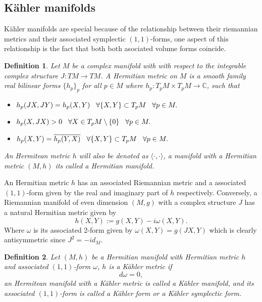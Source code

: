 \documentclass[12pt,twoside,a4paper]{report}
\newtheorem{definition}{Definition}[section]
\newcommand{\co}{\ensuremath{\mathbb C }}
\begin{document}
\subsection{Kähler manifolds}
Kähler manifolds are special because of the relationship between their riemannian metrics and their associated symplectic $(1,1)$-forms, one aspect of this relationship is the fact that both both asociated volume forms coincide.
\begin{definition}
        Let $M$ be a complex manifold with with respect to the integrable complex structure
        $J:TM\rightarrow TM$. A \textit{Hermitian metric} on $M$ is a smooth family
        real bilinear forms $\lbrace h_p\rbrace_p$ for all $p\in M$ where
        $h_p:T_pM\times T_pM\rightarrow\co$, such that
\begin{itemize}
        \item $h_p(JX,JY)=h_p(X,Y)\hspace{0.3cm}\forall\lbrace X,Y\rbrace\subset T_pM\hspace{0.3cm}\forall p\in M.$
        \item $h_p(X,JX)>0\hspace{0.3cm}\forall X\in T_p M\setminus\lbrace 0\rbrace\hspace{0.3cm}\forall p\in M.$
        \item $h_p(X,Y)=\overline{h_p(Y,X)}\hspace{0.3cm}\forall\lbrace X,Y\rbrace\subset T_pM\hspace{0.3cm}\forall p\in M.$
\end{itemize}
An Hermitean metric $h$ will also be denoted as $\langle\cdot,\cdot\rangle$, a manifold with a Hermitian metric $(M,h)$ its called a \textit{Hermitian manifold}.
\end{definition}
An Hermitian metric $h$ has an associated Riemannian metric and a associated $(1,1)$-form given by the real and
imaginary part of $h$ respectively. Conversely, a Riemannian manifold of even dimension $(M,g)$ with a complex structure $J$ has
a natural Hermitian metric given by
\[
  h(X,Y):=g(X,Y)-i\omega(X,Y).
\]
\noindent Where $\omega$ is its associated 2-form given by $\omega(X,Y)=g(JX,Y)$ which is clearly antisymmetric since $J^2=-id_M$.
\begin{definition}
        Let $(M,h)$ be a Hermitian manifold with Hermitian metric $h$ and associated $(1,1)$-form $\omega$, $h$ is a Kähler metric if
        \[
          d\omega=0,
        \]
        \noindent an Hermitean manifold with a Kähler metric is called a \textit{Kähler manifold}, and its associated $(1,1)$-form is  called a \textit{Kähler form} or a \textit{Kähler symplectic form}.
\end{definition}
\end{document}
